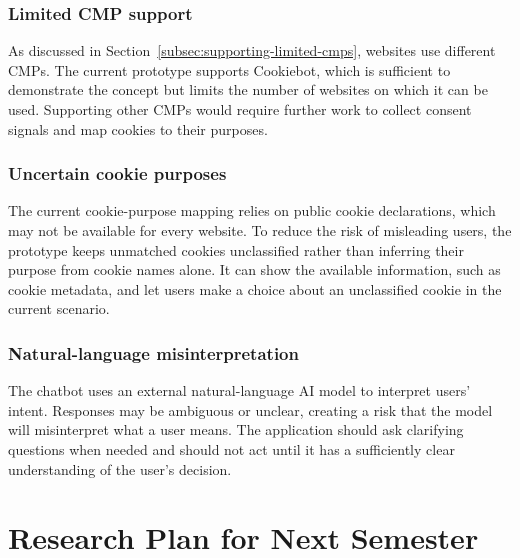 \documentclass[11pt,a4paper]{report}
\begin{document}
\subsection{Limited CMP support}
As discussed in Section~\ref{subsec:supporting-limited-cmps}, websites use different CMPs. The current prototype supports Cookiebot, which is sufficient to demonstrate the concept but limits the number of websites on which it can be used. Supporting other CMPs would require further work to collect consent signals and map cookies to their purposes.
\subsection{Uncertain cookie purposes}
The current cookie-purpose mapping relies on public cookie declarations, which may not be available for every website. To reduce the risk of misleading users, the prototype keeps unmatched cookies unclassified rather than inferring their purpose from cookie names alone. It can show the available information, such as cookie metadata, and let users make a choice about an unclassified cookie in the current scenario.
\subsection{Natural-language misinterpretation}
The chatbot uses an external natural-language AI model to interpret users' intent. Responses may be ambiguous or unclear, creating a risk that the model will misinterpret what a user means. The application should ask clarifying questions when needed and should not act until it has a sufficiently clear understanding of the user's decision.
\chapter{Research Plan for Next Semester}
\end{document}
